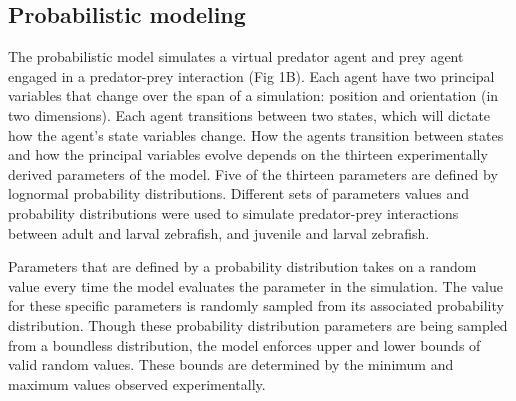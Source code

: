 \documentclass[]{rsos}%
\begin{document}
\subsection{Probabilistic modeling}
The probabilistic model simulates a virtual predator agent and prey agent engaged in a predator-prey interaction (Fig 1B). Each agent have two principal variables that change over the span of a simulation: position and orientation (in two dimensions). Each agent transitions between two states, which will dictate how the agent’s state variables change. How the agents transition between states and how the principal variables evolve depends on the thirteen experimentally derived parameters of the model. Five of the thirteen parameters are defined by lognormal probability distributions. Different sets of parameters values and probability distributions were used to simulate predator-prey interactions between adult and larval zebrafish, and juvenile and larval zebrafish.

Parameters that are defined by a probability distribution takes on a random value every time the model evaluates the parameter in the simulation. The value for these specific parameters is randomly sampled from its associated probability distribution. Though these probability distribution parameters are being sampled from a boundless distribution, the model enforces upper and lower bounds of valid random values. These bounds are determined by the minimum and maximum values observed experimentally. 
\end{document}
